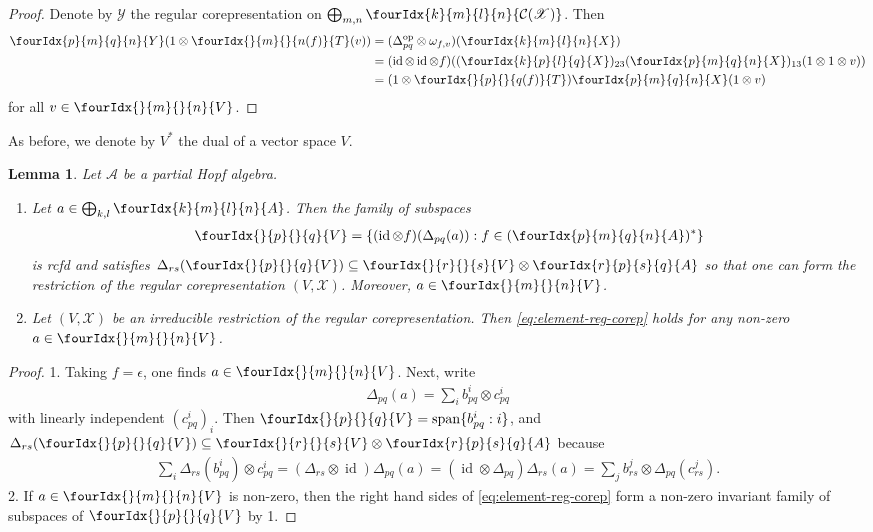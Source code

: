 \documentclass[10pt]{article}
\DeclareMathOperator{\id}{id}
\DeclareMathOperator{\op}{\mathrm{op}}
\newcommand{\dual}[1]{#1^{*}}
\newcommand{\Gr}[5]{\fourIdx{#2}{#4}{#3}{#5}{#1}}%
\newcommand{\Gru}[3]{\Gr{#1}{}{}{#2}{#3}}
\newtheorem{Lem}[Theorem]{Lemma}
\theoremstyle{definition}
\numberwithin{equation}{section}
\begin{document}
\begin{proof}
  Denote by $\mathscr{Y}$ the regular corepresentation on
  $\bigoplus_{m,n } \Gr{\mathcal{C}(\mathscr{X})}{k}{l}{m}{n}$. Then
  \begin{align*}
 \Gr{Y}{p}{q}{m}{n}    (1\otimes \Gr{T}{}{}{m}{n(f)}(v)) &= 
(\Delta^{\op}_{pq} \otimes \omega_{f,v})( \Gr{X}{k}{l}{m}{n}) 
\\ & = (\id \otimes \id \otimes
f)((\Gr{X}{k}{l}{p}{q})_{23}(\Gr{X}{p}{q}{m}{n})_{13}(1 \otimes 1
 \otimes v)) \\ &=(1 \otimes \Gr{T}{}{}{p}{q(f)})\Gr{X}{p}{q}{m}{n}(1 \otimes v)
  \end{align*}
for all $v \in \Gru{V}{m}{n}$.
\end{proof}
As before, we denote by $\dual{V}$ the dual of a vector space $V$.
\begin{Lem} \label{lemma:regular-corep} Let $\mathscr{A}$ be a partial
  Hopf algebra.
  \begin{enumerate}
  \item  Let $a \in \bigoplus_{k,l} \Gr{A}{k}{l}{m}{n}$. Then the family of
  subspaces
  \begin{align} \label{eq:element-reg-corep}
    \Gru{V}{p}{q} = \{ (\id\otimes f)(\Delta_{pq}(a)) : f \in
    \dual{(\Gr{A}{p}{q}{m}{n})}\}
  \end{align}
  is rcfd and satisfies $\Delta_{rs}(\Gru{V}{p}{q}) \subseteq
  \Gru{V}{r}{s} \otimes \Gr{A}{r}{s}{p}{q}$ so that one can form the
  restriction of the regular corepresentation
  $(V,\mathscr{X})$. Moreover, $a \in \Gru{V}{m}{n}$.
\item Let $(V,\mathscr{X})$ be an irreducible restriction of the
  regular corepresentation. Then \eqref{eq:element-reg-corep} holds
  for any non-zero $a \in \Gru{V}{m}{n}$.
  \end{enumerate}
\end{Lem}
\begin{proof}
1.  Taking $f=\epsilon$, one finds $a \in \Gru{V}{m}{n}$. Next, write
  \begin{align*}
    \Delta_{pq}(a)=\sum_{i} b_{pq}^{i} \otimes c^{i}_{pq}
  \end{align*}
  with linearly independent $(c_{pq}^{i})_{i}$. Then $ \Gru{V}{p}{q} =
  \mathrm{span}\{b_{pq}^{i} : i \}$, and  $\Delta_{rs}(\Gru{V}{p}{q}) \subseteq
  \Gru{V}{r}{s} \otimes \Gr{A}{r}{s}{p}{q}$ because
  \begin{align*}
 \sum_{i}
    \Delta_{rs}(b^{i}_{pq}) \otimes c^{i}_{pq} =
    (\Delta_{rs} \otimes \id)\Delta_{pq}(a) = (\id \otimes
    \Delta_{pq}) \Delta_{rs}(a) = \sum_{j} b^{j}_{rs} \otimes
    \Delta_{pq}(c^{j}_{rs}).
  \end{align*}
  2.  If $a\in \Gru{V}{m}{n}$ is non-zero, then the right hand
  sides of \eqref{eq:element-reg-corep} form a non-zero invariant
  family of subspaces of $\Gru{V}{p}{q}$ by 1.
\end{proof}
\end{document}
